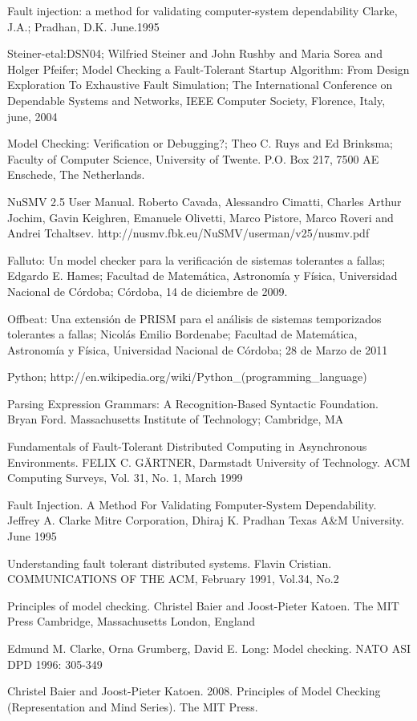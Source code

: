 \documentclass[titlepage, 12pt]{book}
\begin{document}
\begin{thebibliography}{99}

 Fault injection: a method for validating computer-system dependability
Clarke, J.A.; Pradhan, D.K. June.1995 

 Steiner-etal:DSN04; Wilfried Steiner and John Rushby and Maria Sorea and Holger Pfeifer; Model Checking a Fault-Tolerant Startup Algorithm: From Design Exploration To Exhaustive Fault Simulation; The International Conference on Dependable Systems and Networks, IEEE Computer Society, Florence, Italy, june, 2004

 Model Checking: Verification or Debugging?; Theo C. Ruys and Ed Brinksma; Faculty of Computer Science, University of Twente. P.O. Box 217, 7500 AE Enschede, The Netherlands.

 NuSMV 2.5 User Manual. Roberto Cavada, Alessandro Cimatti, Charles Arthur Jochim, Gavin Keighren,
Emanuele Olivetti, Marco Pistore, Marco Roveri and Andrei Tchaltsev. http://nusmv.fbk.eu/NuSMV/userman/v25/nusmv.pdf

 Falluto: Un model checker para la verificaci\'on de sistemas tolerantes a fallas; Edgardo E. Hames; Facultad de Matem\'atica, Astronom\'ia y F\'isica, Universidad Nacional de C\'ordoba; C\'ordoba, 14 de diciembre de 2009.

 Offbeat: Una extensi\'on de PRISM para el an\'alisis de sistemas temporizados tolerantes a fallas; Nicol\'as Emilio Bordenabe; Facultad de Matem\'atica, Astronom\'ia y F\'isica, Universidad Nacional de C\'ordoba; 28 de Marzo de 2011

 Python; http://en.wikipedia.org/wiki/Python\_(programming\_language)

 Parsing Expression Grammars: A Recognition-Based Syntactic Foundation. Bryan Ford. Massachusetts Institute of Technology; Cambridge, MA

 Fundamentals of Fault-Tolerant Distributed Computing in Asynchronous Environments. FELIX C. GÄRTNER,
Darmstadt University of Technology. ACM Computing Surveys, Vol. 31, No. 1, March 1999

 Fault Injection. A Method For Validating Fomputer-System Dependability. Jeffrey A. Clarke Mitre Corporation, Dhiraj K. Pradhan Texas A\&M University. June 1995

 Understanding fault tolerant distributed systems. Flavin Cristian. COMMUNICATIONS OF THE ACM, February 1991, Vol.34, No.2

 Principles of model checking. Christel Baier and Joost-Pieter Katoen. The MIT Press Cambridge, Massachusetts
London, England

 Edmund M. Clarke, Orna Grumberg, David E. Long: Model checking. NATO ASI DPD 1996: 305-349

 Christel Baier and Joost-Pieter Katoen. 2008. Principles of Model Checking (Representation and Mind Series). The MIT Press.

\end{thebibliography}

\end{document}
